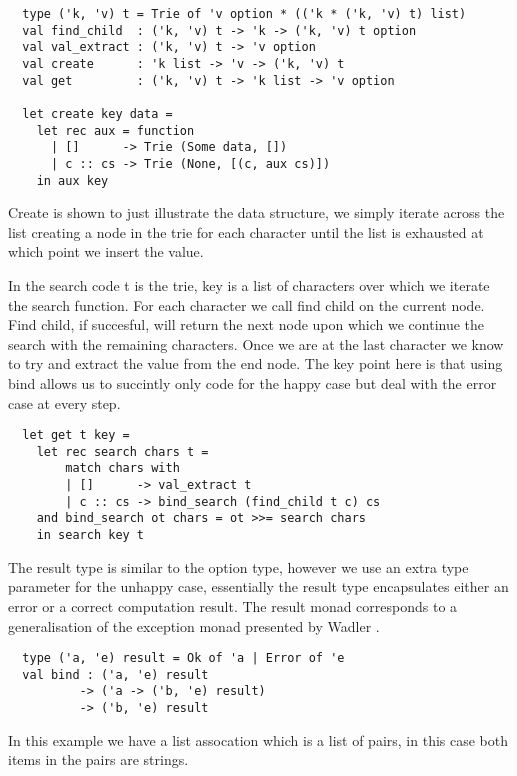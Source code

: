 \documentclass[a4paper,10pt]{article}
\theoremstyle{definition}
\begin{document}
\begin{verbatim}
  type ('k, 'v) t = Trie of 'v option * (('k * ('k, 'v) t) list)
  val find_child  : ('k, 'v) t -> 'k -> ('k, 'v) t option
  val val_extract : ('k, 'v) t -> 'v option
  val create      : 'k list -> 'v -> ('k, 'v) t
  val get         : ('k, 'v) t -> 'k list -> 'v option

  let create key data =
    let rec aux = function
      | []      -> Trie (Some data, [])
      | c :: cs -> Trie (None, [(c, aux cs)])
    in aux key
\end{verbatim}

Create is shown to just illustrate the data structure,
we simply iterate across the list creating a node in the trie for each character
until the list is exhausted at which point we insert the value.


In the search code t is the trie, key is a list of characters over which
we iterate the search function. For each character we call find child on
the current node. Find child, if succesful, will return the next node
upon which we continue the search with the remaining characters. Once we
are at the last character we know to try and extract the value from the end
node. The key point here is that using bind allows us to succintly only code
for the happy case but deal with the error case at every step.

\begin{verbatim}
  let get t key =
    let rec search chars t =
        match chars with
        | []      -> val_extract t
        | c :: cs -> bind_search (find_child t c) cs
    and bind_search ot chars = ot >>= search chars
    in search key t
\end{verbatim}

The result type is similar to the option type, however we use an extra type
parameter for the unhappy case, essentially the result type encapsulates 
either an error or a correct computation result. The result monad
corresponds to a generalisation of the exception monad presented by Wadler \cite{wadler1995monads}.

\begin{verbatim}
  type ('a, 'e) result = Ok of 'a | Error of 'e
  val bind : ('a, 'e) result
          -> ('a -> ('b, 'e) result)
          -> ('b, 'e) result
\end{verbatim}

In this example we have a list assocation which is a list of pairs, in this case both
items in the pairs are strings.
\end{document}
